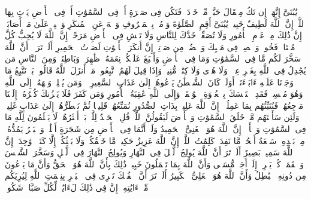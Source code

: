 \stopbuffer%
\startbuffer[\q:31:16]
یَٰبُنَیَّ إِنَّهَاۤ إِن تَكُ مِثۡقَالَ حَبَّةࣲ مِّنۡ خَرۡدَلࣲ فَتَكُن فِی صَخۡرَةٍ أَوۡ فِی ٱلسَّمَٰوَٰتِ أَوۡ فِی ٱلۡأَرۡضِ یَأۡتِ بِهَا ٱللَّهُۚ إِنَّ ٱللَّهَ لَطِیفٌ خَبِیرࣱ%
\stopbuffer%
\startbuffer[\q:31:17]
یَٰبُنَیَّ أَقِمِ ٱلصَّلَوٰةَ وَأۡمُرۡ بِٱلۡمَعۡرُوفِ وَٱنۡهَ عَنِ ٱلۡمُنكَرِ وَٱصۡبِرۡ عَلَىٰ مَاۤ أَصَابَكَۖ إِنَّ ذَٰلِكَ مِنۡ عَزۡمِ ٱلۡأُمُورِ%
\stopbuffer%
\startbuffer[\q:31:18]
وَلَا تُصَعِّرۡ خَدَّكَ لِلنَّاسِ وَلَا تَمۡشِ فِی ٱلۡأَرۡضِ مَرَحًاۖ إِنَّ ٱللَّهَ لَا یُحِبُّ كُلَّ مُخۡتَالࣲ فَخُورࣲ%
\stopbuffer%
\startbuffer[\q:31:19]
وَٱقۡصِدۡ فِی مَشۡیِكَ وَٱغۡضُضۡ مِن صَوۡتِكَۚ إِنَّ أَنكَرَ ٱلۡأَصۡوَٰتِ لَصَوۡتُ ٱلۡحَمِیرِ%
\stopbuffer%
\startbuffer[\q:31:20]
أَلَمۡ تَرَوۡا۟ أَنَّ ٱللَّهَ سَخَّرَ لَكُم مَّا فِی ٱلسَّمَٰوَٰتِ وَمَا فِی ٱلۡأَرۡضِ وَأَسۡبَغَ عَلَیۡكُمۡ نِعَمَهُۥ ظَٰهِرَةࣰ وَبَاطِنَةࣰۗ وَمِنَ ٱلنَّاسِ مَن یُجَٰدِلُ فِی ٱللَّهِ بِغَیۡرِ عِلۡمࣲ وَلَا هُدࣰى وَلَا كِتَٰبࣲ مُّنِیرࣲ%
\stopbuffer%
\startbuffer[\q:31:21]
وَإِذَا قِیلَ لَهُمُ ٱتَّبِعُوا۟ مَاۤ أَنزَلَ ٱللَّهُ قَالُوا۟ بَلۡ نَتَّبِعُ مَا وَجَدۡنَا عَلَیۡهِ ءَابَاۤءَنَاۤۚ أَوَلَوۡ كَانَ ٱلشَّیۡطَٰنُ یَدۡعُوهُمۡ إِلَىٰ عَذَابِ ٱلسَّعِیرِ%
\stopbuffer%
\startbuffer[\q:31:22]
۞ وَمَن یُسۡلِمۡ وَجۡهَهُۥۤ إِلَى ٱللَّهِ وَهُوَ مُحۡسِنࣱ فَقَدِ ٱسۡتَمۡسَكَ بِٱلۡعُرۡوَةِ ٱلۡوُثۡقَىٰۗ وَإِلَى ٱللَّهِ عَٰقِبَةُ ٱلۡأُمُورِ%
\stopbuffer%
\startbuffer[\q:31:23]
وَمَن كَفَرَ فَلَا یَحۡزُنكَ كُفۡرُهُۥۤۚ إِلَیۡنَا مَرۡجِعُهُمۡ فَنُنَبِّئُهُم بِمَا عَمِلُوۤا۟ۚ إِنَّ ٱللَّهَ عَلِیمُۢ بِذَاتِ ٱلصُّدُورِ%
\stopbuffer%
\startbuffer[\q:31:24]
نُمَتِّعُهُمۡ قَلِیلࣰا ثُمَّ نَضۡطَرُّهُمۡ إِلَىٰ عَذَابٍ غَلِیظࣲ%
\stopbuffer%
\startbuffer[\q:31:25]
وَلَئِن سَأَلۡتَهُم مَّنۡ خَلَقَ ٱلسَّمَٰوَٰتِ وَٱلۡأَرۡضَ لَیَقُولُنَّ ٱللَّهُۚ قُلِ ٱلۡحَمۡدُ لِلَّهِۚ بَلۡ أَكۡثَرُهُمۡ لَا یَعۡلَمُونَ%
\stopbuffer%
\startbuffer[\q:31:26]
لِلَّهِ مَا فِی ٱلسَّمَٰوَٰتِ وَٱلۡأَرۡضِۚ إِنَّ ٱللَّهَ هُوَ ٱلۡغَنِیُّ ٱلۡحَمِیدُ%
\stopbuffer%
\startbuffer[\q:31:27]
وَلَوۡ أَنَّمَا فِی ٱلۡأَرۡضِ مِن شَجَرَةٍ أَقۡلَٰمࣱ وَٱلۡبَحۡرُ یَمُدُّهُۥ مِنۢ بَعۡدِهِۦ سَبۡعَةُ أَبۡحُرࣲ مَّا نَفِدَتۡ كَلِمَٰتُ ٱللَّهِۚ إِنَّ ٱللَّهَ عَزِیزٌ حَكِیمࣱ%
\stopbuffer%
\startbuffer[\q:31:28]
مَّا خَلۡقُكُمۡ وَلَا بَعۡثُكُمۡ إِلَّا كَنَفۡسࣲ وَٰحِدَةٍۚ إِنَّ ٱللَّهَ سَمِیعُۢ بَصِیرٌ%
\stopbuffer%
\startbuffer[\q:31:29]
أَلَمۡ تَرَ أَنَّ ٱللَّهَ یُولِجُ ٱلَّیۡلَ فِی ٱلنَّهَارِ وَیُولِجُ ٱلنَّهَارَ فِی ٱلَّیۡلِ وَسَخَّرَ ٱلشَّمۡسَ وَٱلۡقَمَرَۖ كُلࣱّ یَجۡرِیۤ إِلَىٰۤ أَجَلࣲ مُّسَمࣰّى وَأَنَّ ٱللَّهَ بِمَا تَعۡمَلُونَ خَبِیرࣱ%
\stopbuffer%
\startbuffer[\q:31:30]
ذَٰلِكَ بِأَنَّ ٱللَّهَ هُوَ ٱلۡحَقُّ وَأَنَّ مَا یَدۡعُونَ مِن دُونِهِ ٱلۡبَٰطِلُ وَأَنَّ ٱللَّهَ هُوَ ٱلۡعَلِیُّ ٱلۡكَبِیرُ%
\stopbuffer%
\startbuffer[\q:31:31]
أَلَمۡ تَرَ أَنَّ ٱلۡفُلۡكَ تَجۡرِی فِی ٱلۡبَحۡرِ بِنِعۡمَتِ ٱللَّهِ لِیُرِیَكُم مِّنۡ ءَایَٰتِهِۦۤۚ إِنَّ فِی ذَٰلِكَ لَءَایَٰتࣲ لِّكُلِّ صَبَّارࣲ شَكُورࣲ%
\stopbuffer%
